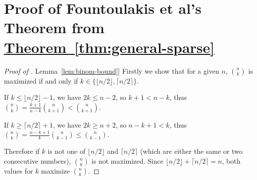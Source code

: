 \documentclass[11pt]{article}
\numberwithin{equation}{section}
\theoremstyle{definition}
\theoremstyle{plain}
\newcommand{\expref}[2]{\hyperref[#2]{#1~\ref{#2}}}
\begin{document}
			
			
			\appendix
			
			
			\section{Proof of Fountoulakis et al's Theorem from \expref{Theorem}{thm:general-sparse}} 
			\label{appx:FKM-proof}
			
			\iffalse %
			\begin{proof}[Proof of \expref{Lemma}{lem:binom-bound}]
				Firstly we show that for a given $n$, $\binom{n}{k}$ is maximized if and only if $k \in \{\lfloor n/2 \rfloor, \lceil n/2 \rceil\}$.
				
				\medskip
				
				\noindent If $k \le \lfloor n/2 \rfloor - 1$, we have $2k \le n - 2$, so $k + 1 < n - k$, thus
				$\displaystyle \binom{n}{k} = \frac{k + 1}{n - k} \binom{n}{k + 1} < \binom{n}{k + 1}$.
				
				\medskip
				
				\noindent If $k \ge \lceil n/2 \rceil + 1$, we have $2k \ge n + 2$, so $n - k + 1 < k$, thus
				$\displaystyle \binom{n}{k} = \frac{n - k + 1}{k} \binom{n}{k - 1} \le \binom{n}{k - 1}$.
				
				\medskip
				
				Therefore if $k$ is not one of $\lfloor n/2 \rfloor$ and $\lceil n/2 \rceil$ (which are either the same or two consecutive numbers), $\binom{n}{k}$ is not maximized.
				Since $\lfloor n/2 \rfloor + \lceil n/2 \rceil = n$, both values for $k$
				maximize $\binom{n}{k}$.  %
				

\end{proof}
\end{document}
